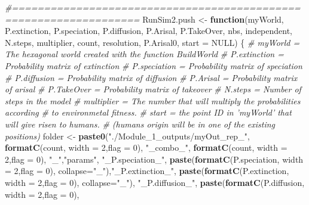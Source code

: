 \documentclass[]{book}
\newenvironment{Shaded}{\begin{snugshade}}{\end{snugshade}}
\newcommand{\KeywordTok}[1]{\textcolor[rgb]{0.13,0.29,0.53}{\textbf{{#1}}}}
\newcommand{\DataTypeTok}[1]{\textcolor[rgb]{0.13,0.29,0.53}{{#1}}}
\newcommand{\DecValTok}[1]{\textcolor[rgb]{0.00,0.00,0.81}{{#1}}}
\newcommand{\StringTok}[1]{\textcolor[rgb]{0.31,0.60,0.02}{{#1}}}
\newcommand{\CommentTok}[1]{\textcolor[rgb]{0.56,0.35,0.01}{\textit{{#1}}}}
\newcommand{\OtherTok}[1]{\textcolor[rgb]{0.56,0.35,0.01}{{#1}}}
\newcommand{\ControlFlowTok}[1]{\textcolor[rgb]{0.13,0.29,0.53}{\textbf{{#1}}}}
\newcommand{\NormalTok}[1]{{#1}}
\theoremstyle{definition}
\theoremstyle{definition}
\theoremstyle{definition}
\theoremstyle{remark}
\begin{document}
\begin{Shaded}
\begin{Highlighting}[]
\CommentTok{#==================================================================}
\NormalTok{RunSim2.push <-}\StringTok{ }\ControlFlowTok{function}\NormalTok{(myWorld, P.extinction, P.speciation,}
\NormalTok{                    P.diffusion, P.Arisal, P.TakeOver, nbs, independent,}
\NormalTok{                    N.steps, multiplier, count, resolution, P.Arisal0,}
                    \DataTypeTok{start =} \OtherTok{NULL}\NormalTok{) \{}
  \CommentTok{# myWorld = The hexagonal world created with the function BuildWorld}
  \CommentTok{# P.extinction = Probability matrix of extinction}
  \CommentTok{# P.speciation = Probability matrix of speciation}
  \CommentTok{# P.diffusion = Probability matrix of diffusion}
  \CommentTok{# P.Arisal = Probability matrix of arisal}
  \CommentTok{# P.TakeOver = Probability matrix of takeover}
  \CommentTok{# N.steps = Number of steps in the model}
  \CommentTok{# multiplier = The number that will multiply the probabilities according}
  \CommentTok{# to environmetal fitness.}
  \CommentTok{# start = the point ID in 'myWorld' that will give risen to humans.}
  \CommentTok{# (humans origin will be in one of the existing positions)}
\NormalTok{  folder <-}\StringTok{ }\KeywordTok{paste0}\NormalTok{(}\StringTok{"./Module_1_outputs/myOut_rep_"}\NormalTok{,}
                   \KeywordTok{formatC}\NormalTok{(count, }\DataTypeTok{width =} \DecValTok{2}\NormalTok{,}\DataTypeTok{flag =} \DecValTok{0}\NormalTok{),}
                   \StringTok{"_combo_"}\NormalTok{,}
                   \KeywordTok{formatC}\NormalTok{(count, }\DataTypeTok{width =} \DecValTok{2}\NormalTok{,}\DataTypeTok{flag =} \DecValTok{0}\NormalTok{),}
                   \StringTok{"_"}\NormalTok{,}\StringTok{"params"}\NormalTok{, }\StringTok{"_P.speciation_"}\NormalTok{,}
                   \KeywordTok{paste}\NormalTok{(}\KeywordTok{formatC}\NormalTok{(P.speciation, }\DataTypeTok{width =} \DecValTok{2}\NormalTok{,}\DataTypeTok{flag =} \DecValTok{0}\NormalTok{),}
                         \DataTypeTok{collapse=}\StringTok{"_"}\NormalTok{),}\StringTok{"_P.extinction_"}\NormalTok{,}
                   \KeywordTok{paste}\NormalTok{(}\KeywordTok{formatC}\NormalTok{(P.extinction, }\DataTypeTok{width =} \DecValTok{2}\NormalTok{,}\DataTypeTok{flag =} \DecValTok{0}\NormalTok{),}
                         \DataTypeTok{collapse=}\StringTok{"_"}\NormalTok{), }\StringTok{"_P.diffusion_"}\NormalTok{,}
                   \KeywordTok{paste}\NormalTok{(}\KeywordTok{formatC}\NormalTok{(P.diffusion, }\DataTypeTok{width =} \DecValTok{2}\NormalTok{,}\DataTypeTok{flag =} \DecValTok{0}\NormalTok{),}

\end{Highlighting}
\end{Shaded}
\end{document}
